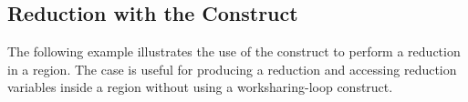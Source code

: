 




\subsection{Reduction with the  Construct}
\label{subsec:reduction_scope}

The following example illustrates the use of the  construct 
to perform a reduction in a  region. The case is useful for 
producing a reduction and accessing reduction variables inside a  region 
without using a worksharing-loop construct.

\clearpage


